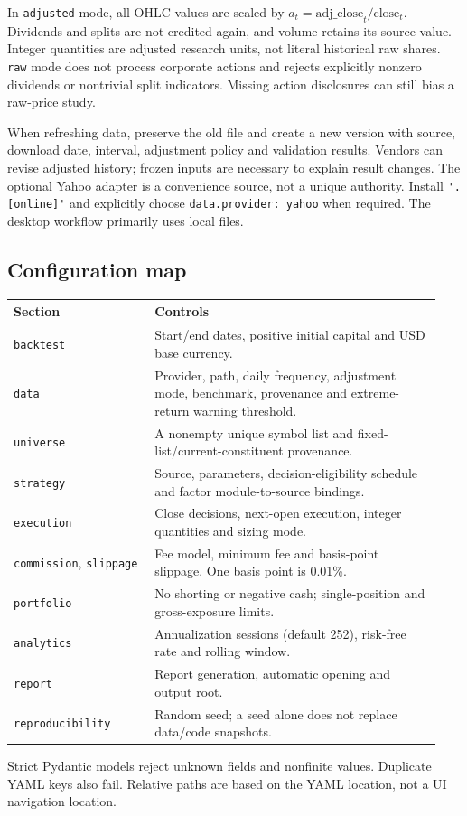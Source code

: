 \documentclass[11pt]{article}
\newcommand{\code}[1]{\nolinkurl{#1}}
\let\originalsubsection\subsection
\renewcommand{\subsection}{\Needspace{8\baselineskip}\originalsubsection}
\begin{document}
In \code{adjusted} mode, all OHLC values are scaled by \(a_t=\text{adj\_close}_t/\text{close}_t\). Dividends and splits are not credited again, and volume retains its source value. Integer quantities are adjusted research units, not literal historical raw shares. \code{raw} mode does not process corporate actions and rejects explicitly nonzero dividends or nontrivial split indicators. Missing action disclosures can still bias a raw-price study.

When refreshing data, preserve the old file and create a new version with source, download date, interval, adjustment policy and validation results. Vendors can revise adjusted history; frozen inputs are necessary to explain result changes. The optional Yahoo adapter is a convenience source, not a unique authority. Install \code{'.[online]'} and explicitly choose \code{data.provider: yahoo} when required. The desktop workflow primarily uses local files.

\subsection{Configuration map}
\begin{longtable}{p{0.31\linewidth}p{0.63\linewidth}}
\toprule Section & Controls\\\midrule\endhead
\code{backtest} & Start/end dates, positive initial capital and USD base currency.\\
\code{data} & Provider, path, daily frequency, adjustment mode, benchmark, provenance and extreme-return warning threshold.\\
\code{universe} & A nonempty unique symbol list and fixed-list/current-constituent provenance.\\
\code{strategy} & Source, parameters, decision-eligibility schedule and factor module-to-source bindings.\\
\code{execution} & Close decisions, next-open execution, integer quantities and sizing mode.\\
\code{commission}, \code{slippage} & Fee model, minimum fee and basis-point slippage. One basis point is 0.01\%.\\
\code{portfolio} & No shorting or negative cash; single-position and gross-exposure limits.\\
\code{analytics} & Annualization sessions (default 252), risk-free rate and rolling window.\\
\code{report} & Report generation, automatic opening and output root.\\
\code{reproducibility} & Random seed; a seed alone does not replace data/code snapshots.\\
\bottomrule
\end{longtable}
Strict Pydantic models reject unknown fields and nonfinite values. Duplicate YAML keys also fail. Relative paths are based on the YAML location, not a UI navigation location.
\end{document}
